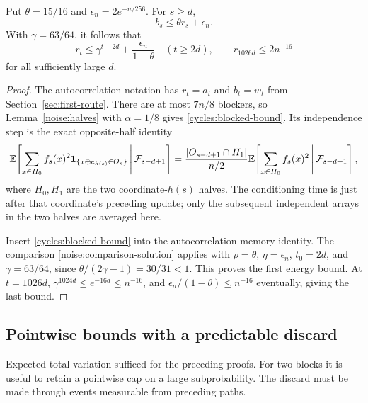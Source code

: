 \begin{lemma}
\label{cycles:halves}
Put $\theta=15/16$ and $\epsilon_n=2e^{-n/256}$. For $s\ge d$,
\begin{equation}\label{cycles:blocked-bound}
 b_s\le\theta r_s+\epsilon_n.
\end{equation}
With $\gamma=63/64$, it follows that
\begin{equation}\label{cycles:autocorrelation-energy}
 r_t\le\gamma^{t-2d}+\frac{\epsilon_n}{1-\theta}
 \quad(t\ge2d),\qquad
 r_{1026d}\le2n^{-16}
\end{equation}
for all sufficiently large $d$.
\end{lemma}
\begin{proof}
The autocorrelation notation has $r_t=a_t$ and $b_t=w_t$ from
Section~\ref{sec:first-route}. There are at most $7n/8$ blockers,
so Lemma~\ref{noise:halves} with $\alpha=1/8$ gives
\eqref{cycles:blocked-bound}. Its independence step is the exact
opposite-half identity
\begin{equation}\label{cycles:half-factorization}
 \mathbb E\!\left[\sum_{x\in H_0}f_s(x)^2
       \mathbf 1_{\{x\oplus e_{h(s)}\in O_s\}}
       \,\middle|\,\mathcal F_{s-d+1}\right]
 =\frac{|O_{s-d+1}\cap H_1|}{n/2}
       \mathbb E\!\left[\sum_{x\in H_0}f_s(x)^2
       \,\middle|\,\mathcal F_{s-d+1}\right],
\end{equation}
where $H_0,H_1$ are the two coordinate-$h(s)$ halves. The conditioning
time is just after that coordinate's preceding update; only the
subsequent independent arrays in the two halves are averaged here.

Insert \eqref{cycles:blocked-bound} into the autocorrelation memory
identity. The comparison \eqref{noise:comparison-solution} applies with
$\rho=\theta$, $\eta=\epsilon_n$, $t_0=2d$, and $\gamma=63/64$,
since $\theta/(2\gamma-1)=30/31<1$. This proves the first energy bound.
At $t=1026d$, $\gamma^{1024d}\le e^{-16d}\le n^{-16}$, and
$\epsilon_n/(1-\theta)\le n^{-16}$ eventually, giving the last bound.
\end{proof}

\subsection{Pointwise bounds with a predictable discard}
\label{cycles:predictable}

Expected total variation sufficed for the preceding proofs. For two
blocks it is useful to retain a pointwise cap on a large subprobability.
The discard must be made through events measurable from preceding paths.

